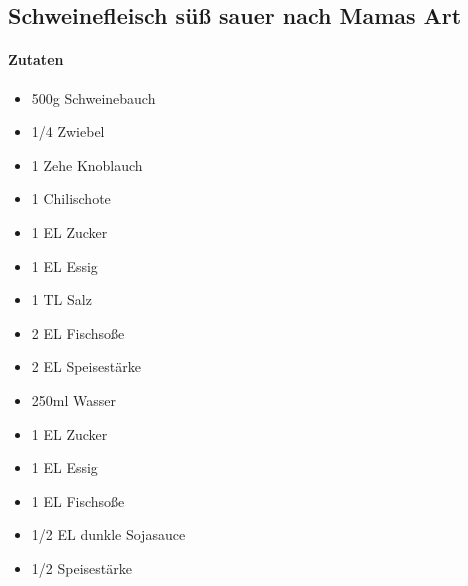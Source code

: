 \newpage
\subsection{Schweinefleisch süß sauer nach Mamas Art}
\paragraph{Zutaten}
\begin{itemize}[noitemsep]
	\item 500g Schweinebauch
	\item 1/4 Zwiebel
	\item 1 Zehe Knoblauch
	\item 1 Chilischote
	\item 1 EL Zucker
	\item 1 EL Essig
	\item 1 TL Salz
	\item 2 EL Fischsoße
	\item 2 EL Speisestärke
	\vspace{0.5cm}
	\item 250ml Wasser
	\item 1 EL Zucker
	\item 1 EL Essig
	\item 1 EL Fischsoße
	\item 1/2 EL dunkle Sojasauce
	\item 1/2 Speisestärke
\end{itemize}
